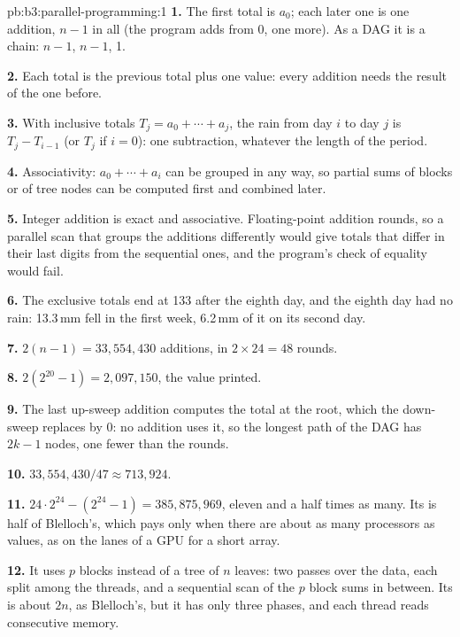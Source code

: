 \begin{solution}{pb:b3:parallel-programming:1}
\textbf{1.} The first total is $a_0$; each later one is one addition, $n - 1$ in all (the program adds from 0, one more). As a DAG it is a chain:  $n - 1$,  $n - 1$,  1.

\textbf{2.} Each total is the previous total plus one value: every addition needs the result of the one before.

\textbf{3.} With inclusive totals $T_j = a_0 + \cdots + a_j$, the rain from day $i$ to day $j$ is $T_j - T_{i-1}$ (or $T_j$ if $i = 0$): one subtraction, whatever the length of the period.

\textbf{4.} Associativity: $a_0 + \cdots + a_i$ can be grouped in any way, so partial sums of blocks or of tree nodes can be computed first and combined later.

\textbf{5.} Integer addition is exact and associative. Floating-point addition rounds, so a parallel scan that groups the additions differently would give totals that differ in their last digits from the sequential ones, and the program's check of equality would fail.

\textbf{6.} The exclusive totals end at 133 after the eighth day, and the eighth day had no rain: 13.3\,mm fell in the first week, 6.2\,mm of it on its second day.

\textbf{7.}  $2(n - 1) = 33{,}554{,}430$ additions, in $2 \times 24 = 48$ rounds.

\textbf{8.} $2(2^{20} - 1) = 2{,}097{,}150$, the value printed.

\textbf{9.} The last up-sweep addition computes the total at the root, which the down-sweep replaces by 0: no addition uses it, so the longest path of the DAG has $2k - 1$ nodes, one fewer than the rounds.

\textbf{10.} $33{,}554{,}430 / 47 \approx 713{,}924$.

\textbf{11.} $24 \cdot 2^{24} - (2^{24} - 1) = 385{,}875{,}969$, eleven and a half times as many. Its  is half of Blelloch's, which pays only when there are about as many processors as values, as on the lanes of a GPU for a short array.

\textbf{12.} It uses $p$ blocks instead of a tree of $n$ leaves: two passes over the data, each split among the threads, and a sequential scan of the $p$ block sums in between. Its  is about $2n$, as Blelloch's, but it has only three phases, and each thread reads consecutive memory.


\end{solution}
